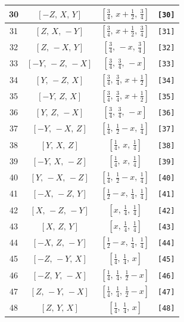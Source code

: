 \documentclass[fleqn,8pt]{jsarticle}
\begin{document}
\begin{longtable}{cccc}
30 & $\left[ - Z,\, X,\, Y \right]$ & $\left[ \frac{3}{4},\, x + \frac{1}{2},\, \frac{3}{4} \right]$ & {\tt [30]} \\ \hline
31 & $\left[ Z,\, X,\, - Y \right]$ & $\left[ \frac{3}{4},\, x + \frac{1}{2},\, \frac{3}{4} \right]$ & {\tt [31]} \\ \hline
32 & $\left[ Z,\, - X,\, Y \right]$ & $\left[ \frac{3}{4},\, - x,\, \frac{3}{4} \right]$ & {\tt [32]} \\ \hline
33 & $\left[ - Y,\, - Z,\, - X \right]$ & $\left[ \frac{3}{4},\, \frac{3}{4},\, - x \right]$ & {\tt [33]} \\ \hline
34 & $\left[ Y,\, - Z,\, X \right]$ & $\left[ \frac{3}{4},\, \frac{3}{4},\, x + \frac{1}{2} \right]$ & {\tt [34]} \\ \hline
35 & $\left[ - Y,\, Z,\, X \right]$ & $\left[ \frac{3}{4},\, \frac{3}{4},\, x + \frac{1}{2} \right]$ & {\tt [35]} \\ \hline
36 & $\left[ Y,\, Z,\, - X \right]$ & $\left[ \frac{3}{4},\, \frac{3}{4},\, - x \right]$ & {\tt [36]} \\ \hline
37 & $\left[ - Y,\, - X,\, Z \right]$ & $\left[ \frac{1}{4},\, \frac{1}{2} - x,\, \frac{1}{4} \right]$ & {\tt [37]} \\ \hline
38 & $\left[ Y,\, X,\, Z \right]$ & $\left[ \frac{1}{4},\, x,\, \frac{1}{4} \right]$ & {\tt [38]} \\ \hline
39 & $\left[ - Y,\, X,\, - Z \right]$ & $\left[ \frac{1}{4},\, x,\, \frac{1}{4} \right]$ & {\tt [39]} \\ \hline
40 & $\left[ Y,\, - X,\, - Z \right]$ & $\left[ \frac{1}{4},\, \frac{1}{2} - x,\, \frac{1}{4} \right]$ & {\tt [40]} \\ \hline
41 & $\left[ - X,\, - Z,\, Y \right]$ & $\left[ \frac{1}{2} - x,\, \frac{1}{4},\, \frac{1}{4} \right]$ & {\tt [41]} \\ \hline
42 & $\left[ X,\, - Z,\, - Y \right]$ & $\left[ x,\, \frac{1}{4},\, \frac{1}{4} \right]$ & {\tt [42]} \\ \hline
43 & $\left[ X,\, Z,\, Y \right]$ & $\left[ x,\, \frac{1}{4},\, \frac{1}{4} \right]$ & {\tt [43]} \\ \hline
44 & $\left[ - X,\, Z,\, - Y \right]$ & $\left[ \frac{1}{2} - x,\, \frac{1}{4},\, \frac{1}{4} \right]$ & {\tt [44]} \\ \hline
45 & $\left[ - Z,\, - Y,\, X \right]$ & $\left[ \frac{1}{4},\, \frac{1}{4},\, x \right]$ & {\tt [45]} \\ \hline
46 & $\left[ - Z,\, Y,\, - X \right]$ & $\left[ \frac{1}{4},\, \frac{1}{4},\, \frac{1}{2} - x \right]$ & {\tt [46]} \\ \hline
47 & $\left[ Z,\, - Y,\, - X \right]$ & $\left[ \frac{1}{4},\, \frac{1}{4},\, \frac{1}{2} - x \right]$ & {\tt [47]} \\ \hline
48 & $\left[ Z,\, Y,\, X \right]$ & $\left[ \frac{1}{4},\, \frac{1}{4},\, x \right]$ & {\tt [48]} \\
\end{longtable}
\end{document}

